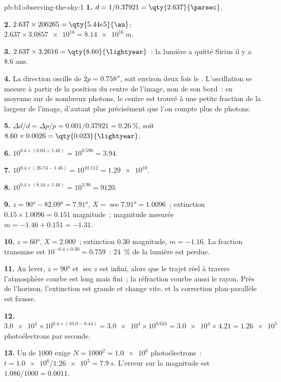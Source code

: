 \begin{solution}{pb:b1:observing-the-sky:1}
\textbf{1.} $d = 1/0.37921 = \qty{2.637}{\parsec}$.

\textbf{2.} $2.637\times206265 = \qty{5.44e5}{\au}$;
$2.637\times\num{3.0857e16} = \qty{8.14e16}{m}$.

\textbf{3.} $2.637\times3.2616 = \qty{8.60}{\lightyear}$~: la lumière a quitté
Sirius il y a 8.6 ans.

\textbf{4.} La direction oscille de $2p = \ang{;;0.758}$, soit environ deux fois
le . L'oscillation se mesure à partir de la position du centre de l'image,
non de son bord~: en moyenne sur de nombreux photons, le centre est trouvé à une
petite fraction de la largeur de l'image, d'autant plus précisément que l'on
compte plus de photons.

\textbf{5.} $\Delta d/d = \Delta p/p = 0.001/0.37921 = \qty{0.26}{\percent}$,
soit $8.60\times0.0026 = \qty{0.023}{\lightyear}$.

\textbf{6.} $10^{0.4\times(0.03 + 1.46)} = 10^{0.596} = 3.94$.

\textbf{7.} $10^{0.4\times(26.74 - 1.46)} = 10^{10.112} = \num{1.29e10}$.

\textbf{8.} $10^{0.4\times(8.44 + 1.46)} = 10^{3.96} = \num{9120}$.

\textbf{9.} $z = \ang{90} - \ang{82.09} = \ang{7.91}$, $X = \sec\ang{7.91} =
1.0096$~; extinction $0.15\times1.0096 = 0.151$ magnitude~; magnitude mesurée
$m = -1.46 + 0.151 = -1.31$.

\textbf{10.} $z = \ang{60}$, $X = 2.000$~; extinction 0.30 magnitude,
$m = -1.16$. La fraction transmise est $10^{-0.4\times0.30} = 0.759$~:
\qty{24}{\percent} de la lumière est perdue.

\textbf{11.} Au lever, $z = \ang{90}$ et $\sec z$ est infini, alors que le
trajet réel à travers l'atmosphère courbe est long mais fini~; la réfraction
courbe aussi le rayon. Près de l'horizon, l'extinction est grande et change vite,
et la correction plan-parallèle est fausse.

\textbf{12.} $\num{3.0e4}\times10^{0.4\times(10.0 - 8.44)} = \num{3.0e4}
\times10^{0.624} = \num{3.0e4}\times4.21 = \num{1.26e5}$ photoélectrons par
seconde.

\textbf{13.} Un  de 1000 exige $N = 1000^2 = \num{1.0e6}$
photoélectrons~: $t = \num{1.0e6}/\num{1.26e5} = \qty{7.9}{s}$. L'erreur sur la
magnitude est $1.086/1000 = \num{0.0011}$.


\end{solution}
